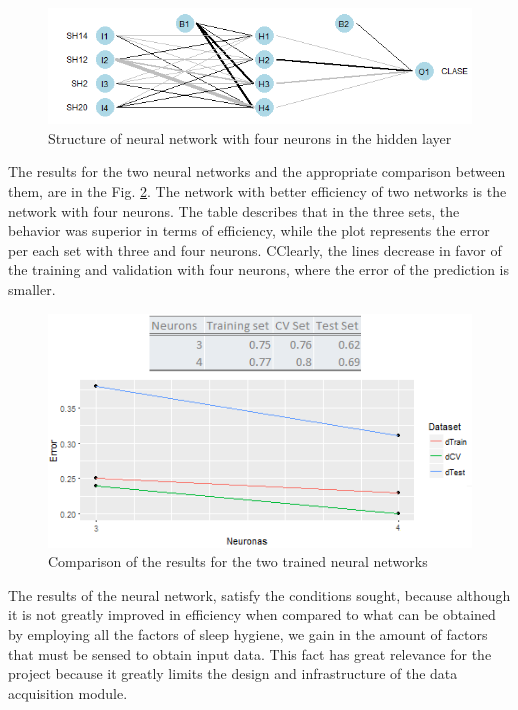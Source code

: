 \documentclass[]{book}
\begin{document}
\begin{figure}[H]

{\centering \includegraphics[width=0.8\linewidth]{images/nn-four-neurons} 

}

\caption{Structure of neural network with four neurons in the hidden layer}\label{fig:nn-four-neurons}
\end{figure}

The results for the two neural networks and the appropriate comparison
between them, are in the Fig. \ref{fig:results-of-the-3-4-nn}. The
network with better efficiency of two networks is the network with four
neurons. The table describes that in the three sets, the behavior was
superior in terms of efficiency, while the plot represents the error per
each set with three and four neurons. CClearly, the lines decrease in
favor of the training and validation with four neurons, where the error
of the prediction is smaller.

\begin{figure}[H]

{\centering \includegraphics[width=0.8\linewidth]{images/results-of-the-3-4-nn} 

}

\caption{Comparison of the results for the two trained neural networks}\label{fig:results-of-the-3-4-nn}
\end{figure}

The results of the neural network, satisfy the conditions sought,
because although it is not greatly improved in efficiency when compared
to what can be obtained by employing all the factors of sleep hygiene,
we gain in the amount of factors that must be sensed to obtain input
data. This fact has great relevance for the project because it greatly
limits the design and infrastructure of the data acquisition module.
\end{document}
